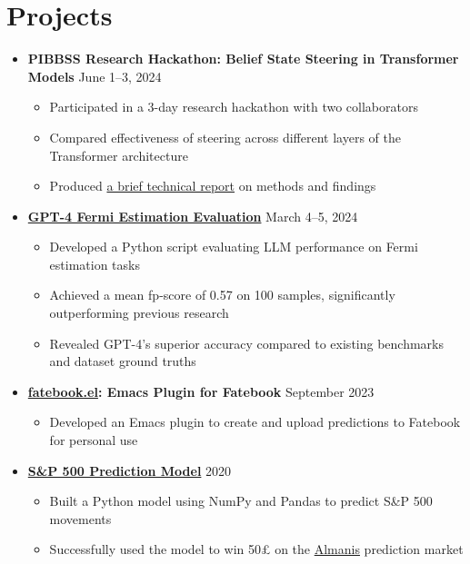 \documentclass[letterpaper, 9pt]{article}
\begin{document}
\section*{Projects}
  \begin{itemize}
    \item \textbf{PIBBSS Research Hackathon: Belief State Steering in Transformer Models} \hfill June 1--3, 2024
    \begin{itemize}
        \item Participated in a 3-day research hackathon with two collaborators
        \item Compared effectiveness of steering across  different layers of the Transformer architecture
        \item Produced \href{https://github.com/sonofhypnos/CV/blob/main/steering-models-belief-states.pdf}{a brief technical report} on methods and findings
    \end{itemize}
    \item \textbf{\href{https://github.com/sonofhypnos/fermi}{GPT-4 Fermi Estimation Evaluation}} \hfill March 4--5, 2024
    \begin{itemize}
      \item Developed a Python script evaluating LLM performance on Fermi estimation tasks
      \item Achieved a mean fp-score of 0.57 on 100 samples, significantly outperforming previous research
      \item Revealed GPT-4's superior accuracy compared to existing benchmarks and dataset ground truths
    \end{itemize}
    \item \textbf{\href{https://github.com/sonofhypnos/fatebook.el}{fatebook.el}: Emacs Plugin for Fatebook} \hfill September 2023
    \begin{itemize}
        \item Developed an Emacs plugin to create and upload predictions to Fatebook for personal use
    \end{itemize}
    \item \textbf{\href{https://sonofhypnos.github.io/blog/prediction/python/2021/01/30/sp500.html}{S\&P 500 Prediction Model}} \hfill 2020
    \begin{itemize}
        \item Built a Python model using NumPy and Pandas to predict S\&P 500 movements
        \item Successfully used the model to win 50£ on the \href{https://www.almanisprivate.com/}{Almanis} prediction market
    \end{itemize}
  \end{itemize}
\end{document}

